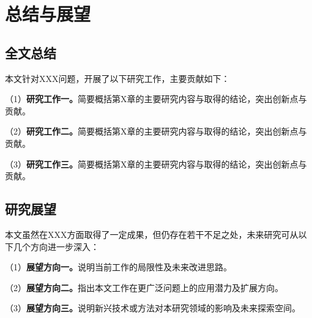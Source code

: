 
\chapter{总结与展望}

\section{全文总结}

本文针对XXX问题，开展了以下研究工作，主要贡献如下：

（1）\textbf{研究工作一。}简要概括第X章的主要研究内容与取得的结论，突出创新点与贡献。

（2）\textbf{研究工作二。}简要概括第X章的主要研究内容与取得的结论，突出创新点与贡献。

（3）\textbf{研究工作三。}简要概括第X章的主要研究内容与取得的结论，突出创新点与贡献。

\section{研究展望}

本文虽然在XXX方面取得了一定成果，但仍存在若干不足之处，未来研究可从以下几个方向进一步深入：

（1）\textbf{展望方向一。}说明当前工作的局限性及未来改进思路。

（2）\textbf{展望方向二。}指出本文工作在更广泛问题上的应用潜力及扩展方向。

（3）\textbf{展望方向三。}说明新兴技术或方法对本研究领域的影响及未来探索空间。
